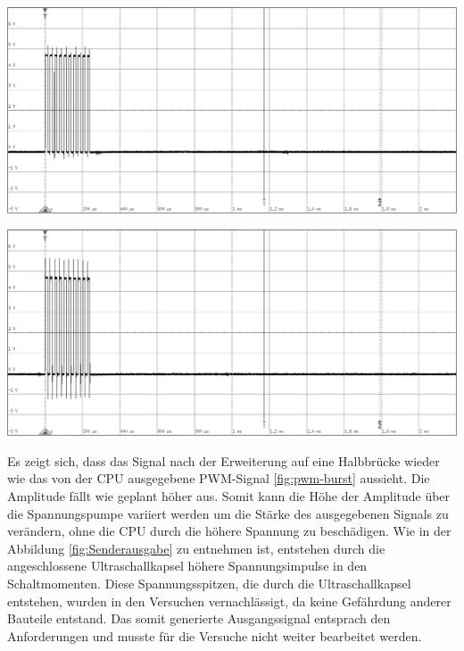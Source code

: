 \begin{minipage}{0.5\textwidth}
\includegraphics[width=1\textwidth%
]{Abbildungen/MessungenP1/PWM-Nach-der-Halbbrucke.png}
\label{fig:Halfbridge}
\end{minipage}
\begin{minipage}{0.5\textwidth}
\includegraphics[width=1\textwidth%
]{Abbildungen/MessungenP1/PWM-Nach-der-Halbbrucke-mit-LS.png}
\label{fig:Senderausgabe}
\end{minipage}
Es zeigt sich, dass das Signal nach der Erweiterung auf eine Halbbrücke wieder wie das von der CPU ausgegebene PWM-Signal \ref{fig:pwm-burst} aussieht. Die Amplitude fällt wie geplant höher aus. Somit kann die Höhe der Amplitude über die Spannungspumpe variiert werden um die Stärke des ausgegebenen Signals zu verändern, ohne die CPU durch die höhere Spannung zu beschädigen. Wie in der Abbildung \ref{fig:Senderausgabe} zu entnehmen ist, entstehen durch die angeschlossene Ultraschallkapsel höhere Spannungsimpulse in den Schaltmomenten. Diese Spannungsspitzen, die durch die Ultraschallkapsel entstehen, wurden in den Versuchen vernachlässigt, da keine Gefährdung anderer Bauteile entstand. Das somit generierte Ausgangssignal entsprach den Anforderungen und musste für die Versuche nicht weiter bearbeitet werden.
